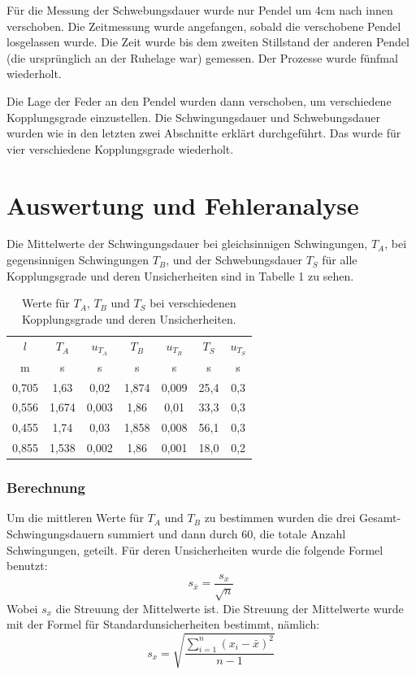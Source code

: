\documentclass[11pt,a4paper]{article}
\begin{document}
Für die Messung der Schwebungsdauer wurde nur Pendel um 4cm nach innen verschoben. Die Zeitmessung wurde angefangen, sobald die verschobene Pendel losgelassen wurde. Die Zeit wurde bis dem zweiten Stillstand der anderen Pendel (die ursprünglich an der Ruhelage war) gemessen. Der Prozesse wurde fünfmal wiederholt. 

Die Lage der Feder an den Pendel wurden dann verschoben, um verschiedene Kopplungsgrade einzustellen. Die Schwingungsdauer und Schwebungsdauer wurden wie in den letzten zwei Abschnitte erklärt durchgeführt. Das wurde für vier verschiedene Kopplungsgrade wiederholt. 

\section{Auswertung und Fehleranalyse}
Die Mittelwerte der Schwingungsdauer bei gleichsinnigen Schwingungen, $T_A$, bei gegensinnigen Schwingungen $T_B$, und der Schwebungsdauer $T_S$ für alle Kopplungsgrade und deren Unsicherheiten sind in Tabelle 1 zu sehen. 
\begin{table} [h]
	\begin{tabular*}{0.99\textwidth}{@{\extracolsep{\fill}}c|cccccc}
		\toprule
		$l$ & $T_A$ & $u_{T_A}$ & $T_B$ & $u_{T_B}$ & $T_S$ & $u_{T_S}$  \\
		m & s & s & s & s & s & s   \\
		\bottomrule
		0,705 & 1,63 & 0,02 & 1,874 & 0,009 & 25,4 & 0,3 \\
		0,556 & 1,674 & 0,003 & 1,86 & 0,01 & 33,3 & 0,3 \\
		0,455 & 1,74 & 0,03 & 1,858 & 0,008 & 56,1 & 0,3\\
		0,855 & 1,538 & 0,002 & 1,86 & 0,001 & 18,0 & 0,2 \\
		\bottomrule
	\end{tabular*}
	\caption{Werte für $T_A$, $T_B$ und $T_S$ bei verschiedenen Kopplungsgrade und deren Unsicherheiten.}
\end{table}
\subsubsection{Berechnung}
Um die mittleren Werte für $T_A$ und $T_B$ zu bestimmen wurden die drei Gesamt-Schwingungsdauern summiert und dann durch 60, die totale Anzahl Schwingungen, geteilt. Für deren Unsicherheiten wurde die folgende Formel benutzt:
$$ s_{\bar{x}} = \frac{s_x}{\sqrt{n}}$$
Wobei $s_x$ die Streuung der Mittelwerte ist. Die Streuung der Mittelwerte wurde mit der Formel für Standardunsicherheiten bestimmt, nämlich:
$$s_x=\sqrt{\frac{\sum_{i=1}^{n}(x_i-\bar{x})^2}{n-1}}$$
\end{document}

